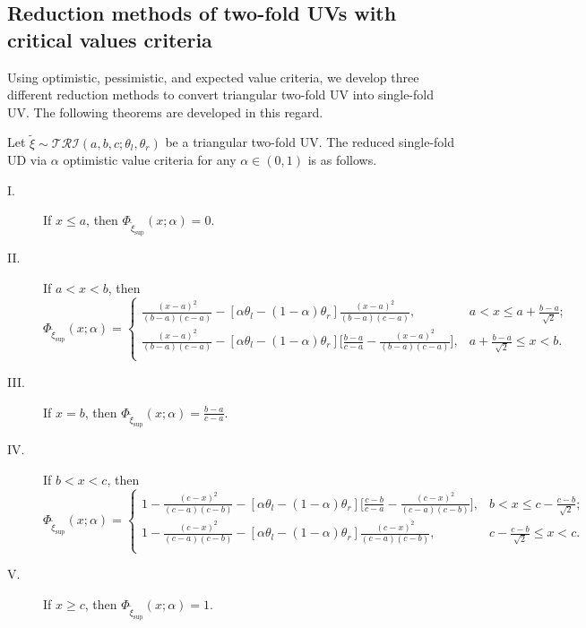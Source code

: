 \subsection{Reduction methods of two-fold UVs with critical values criteria}
Using optimistic, pessimistic, and expected value criteria, we develop three different reduction methods to convert triangular two-fold UV into single-fold UV. The following theorems are developed in this regard.
\begin{theorem}\label{thm.6}
	Let $\tilde{\xi}\sim \mathcal{TRI}(a,b,c;\theta_l,\theta_r)$ be a triangular two-fold UV. The reduced single-fold UD via $\alpha$ optimistic value criteria for any $\alpha \in(0,1)$ is as follows.
	\begin{description}
		\item[ I.] If $x\leq a$, then  $\Phi_{\tilde{\xi}_{\sup}}(x;\alpha)=0.$  
		\item[ II.] If $a< x< b$, then
		\[\Phi_{\tilde{\xi}_{\sup}}(x;\alpha)=\left\{
		\begin{array}{ll}
			\frac{(x-a)^2}{(b-a)(c-a)}-[\alpha\theta_l-(1-\alpha)\theta_r]\frac{(x-a)^2}{(b-a)(c-a)}, & a<x\leq a+\frac{b-a}{\sqrt{2}};\\
			\frac{(x-a)^2}{(b-a)(c-a)}-[\alpha\theta_l-(1-\alpha)\theta_r]\big[\frac{b-a}{c-a}-\frac{(x-a)^2}{(b-a)(c-a)}\big], & a+\frac{b-a}{\sqrt{2}}\leq x<b.\\
		\end{array}
		\right.
		\]
		\item[ III.] If $x=b$, then $\Phi_{\tilde{\xi}_{\sup}}(x;\alpha)=\frac{b-a}{c-a}.$ 
		\item[ IV.] If $b< x< c$, then
		\[\Phi_{\tilde{\xi}_{\sup}}(x;\alpha)=\left\{
		\begin{array}{ll}
			1-\frac{(c-x)^2}{(c-a)(c-b)}-[\alpha\theta_l-(1-\alpha)\theta_r]\big[\frac{c-b}{c-a}-\frac{(c-x)^2}{(c-a)(c-b)}\big], & b<x\leq c-\frac{c-b}{\sqrt{2}};\\
			1-\frac{(c-x)^2}{(c-a)(c-b)}-[\alpha\theta_l-(1-\alpha)\theta_r]\frac{(c-x)^2}{(c-a)(c-b)}, &  c-\frac{c-b}{\sqrt{2}}\leq x<c.\\
		\end{array}
		\right.
		\] 
		\item[ V.] If $x\geq c$, then $\Phi_{\tilde{\xi}_{\sup}}(x;\alpha)=1.$  
	\end{description}
\end{theorem}
